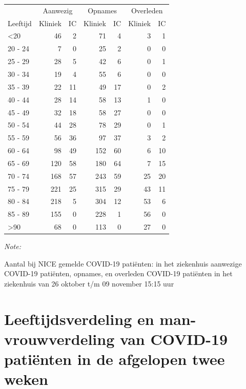\documentclass[
  english,
  man,floatsintext]{apa6}
\begin{document}
\begin{table}
\centering\begingroup\fontsize{10}{12}\selectfont

\begin{threeparttable}
\begin{tabular}{lrrrrrr}
\toprule
\multicolumn{1}{c}{ } & \multicolumn{2}{c}{Aanwezig} & \multicolumn{2}{c}{Opnames} & \multicolumn{2}{c}{Overleden} \\
\cmidrule(l{3pt}r{3pt}){2-3} \cmidrule(l{3pt}r{3pt}){4-5} \cmidrule(l{3pt}r{3pt}){6-7}
Leeftijd & Kliniek & IC & Kliniek & IC & Kliniek & IC\\
\midrule
<20 & 46 & 2 & 71 & 4 & 3 & 1\\
20 - 24 & 7 & 0 & 25 & 2 & 0 & 0\\
25 - 29 & 28 & 5 & 42 & 6 & 0 & 1\\
30 - 34 & 19 & 4 & 55 & 6 & 0 & 0\\
35 - 39 & 22 & 11 & 49 & 17 & 0 & 2\\
40 - 44 & 28 & 14 & 58 & 13 & 1 & 0\\
45 - 49 & 32 & 18 & 58 & 27 & 0 & 0\\
50 - 54 & 44 & 28 & 78 & 29 & 0 & 1\\
55 - 59 & 56 & 36 & 97 & 37 & 3 & 2\\
60 - 64 & 98 & 49 & 152 & 60 & 6 & 10\\
65 - 69 & 120 & 58 & 180 & 64 & 7 & 15\\
70 - 74 & 168 & 57 & 243 & 59 & 25 & 20\\
75 - 79 & 221 & 25 & 315 & 29 & 43 & 11\\
80 - 84 & 218 & 5 & 304 & 12 & 53 & 6\\
85 - 89 & 155 & 0 & 228 & 1 & 56 & 0\\
>90 & 68 & 0 & 113 & 0 & 27 & 0\\
\bottomrule
\end{tabular}
\begin{tablenotes}
\item \textit{Note: } 
\item Aantal bij NICE gemelde COVID-19 patiënten: in het ziekenhuis aanwezige COVID-19 patiënten, opnames, en overleden COVID-19 patiënten in het ziekenhuis van 26 oktober t/m 09 november 15:15 uur
\end{tablenotes}
\end{threeparttable}
\endgroup{}
\end{table}

\newpage

\hypertarget{leeftijdsverdeling-en-man-vrouwverdeling-van-covid-19-patiuxebnten-in-de-afgelopen-twee-weken}{%
\section{Leeftijdsverdeling en man-vrouwverdeling van COVID-19 patiënten in de afgelopen twee weken}\label{leeftijdsverdeling-en-man-vrouwverdeling-van-covid-19-patiuxebnten-in-de-afgelopen-twee-weken}}
\end{document}
